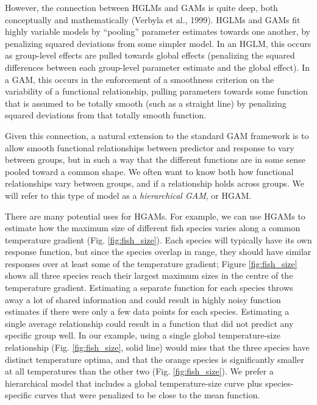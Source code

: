 \documentclass[12pt]{article}
\begin{document}
However, the connection between HGLMs and GAMs is quite deep, both
conceptually and mathematically (Verbyla et al., 1999). HGLMs and GAMs
fit highly variable models by ``pooling'' parameter estimates towards
one another, by penalizing squared deviations from some simpler model.
In an HGLM, this occurs as group-level effects are pulled towards global
effects (penalizing the squared differences between each group-level
parameter estimate and the global effect). In a GAM, this occurs in the
enforcement of a smoothness criterion on the variability of a functional
relationship, pulling parameters towards some function that is assumed
to be totally smooth (such as a straight line) by penalizing squared
deviations from that totally smooth function.

Given this connection, a natural extension to the standard GAM framework
is to allow smooth functional relationships between predictor and
response to vary between groups, but in such a way that the different
functions are in some sense pooled toward a common shape. We often want
to know both how functional relationships vary between groups, and if a
relationship holds across groups. We will refer to this type of model as
a \emph{hierarchical GAM}, or HGAM.

There are many potential uses for HGAMs. For example, we can use HGAMs
to estimate how the maximum size of different fish species varies along
a common temperature gradient (Fig. \ref{fig:fish_size}). Each species
will typically have its own response function, but since the species
overlap in range, they should have similar responses over at least some
of the temperature gradient; Figure \ref{fig:fish_size} shows all three
species reach their largest maximum sizes in the centre of the
temperature gradient. Estimating a separate function for each species
throws away a lot of shared information and could result in highly noisy
function estimates if there were only a few data points for each
species. Estimating a single average relationship could result in a
function that did not predict any specific group well. In our example,
using a single global temperature-size relationship (Fig.
\ref{fig:fish_size}, solid line) would miss that the three species have
distinct temperature optima, and that the orange species is
significantly smaller at all temperatures than the other two (Fig.
\ref{fig:fish_size}). We prefer a hierarchical model that includes a
global temperature-size curve plus species-specific curves that were
penalized to be close to the mean function.
\end{document}
